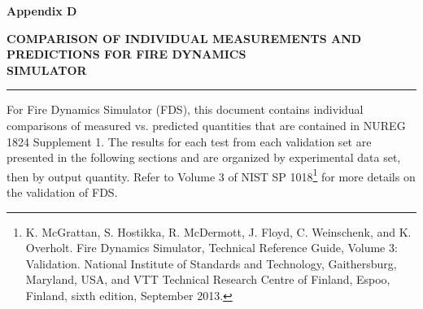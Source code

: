 \documentclass[12pt, titlepage, twoside]{article}
\begin{document}
\thispagestyle{empty}

\huge
\noindent \textbf{Appendix D}

\vspace{0.5em}
\LARGE
\noindent \textbf{COMPARISON OF INDIVIDUAL MEASUREMENTS AND PREDICTIONS FOR FIRE DYNAMICS \\ SIMULATOR}

\normalsize

\vspace{1.5em}
\hrule
\vspace{1.0em}

For Fire Dynamics Simulator (FDS), this document contains individual comparisons of measured vs. predicted quantities that are contained in NUREG 1824 Supplement 1. The results for each test from each validation set are presented in the following sections and are organized by experimental data set, then by output quantity. Refer to Volume 3 of NIST SP 1018\footnote{K. McGrattan, S. Hostikka, R. McDermott, J. Floyd, C. Weinschenk, and K. Overholt. Fire Dynamics Simulator, Technical Reference Guide, Volume 3: Validation. National Institute of Standards and Technology, Gaithersburg, Maryland, USA, and VTT Technical Research Centre of Finland, Espoo, Finland, sixth edition, September 2013.} for more details on the validation of FDS.

\clearpage
{}
\thispagestyle{empty}
\tableofcontents

\appendix

\setcounter{section}{3}


\end{document}
